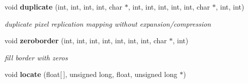 \begin{CompactItemize}
void {\bf duplicate} (int, int, int, int, char $\ast$, int, int, int, int, int, char $\ast$, int, int)
\begin{CompactList}\small\item\em duplicate pixel replication mapping without expansion/compression \item\end{CompactList}\item 
void {\bf zeroborder} (int, int, int, int, int, int, int, char $\ast$, int)
\begin{CompactList}\small\item\em fill border with zeros \item\end{CompactList}\item 
void {\bf locate} (float[$\,$], unsigned long, float, unsigned long $\ast$)\label{xtv_8h_a124}


\end{CompactItemize}
